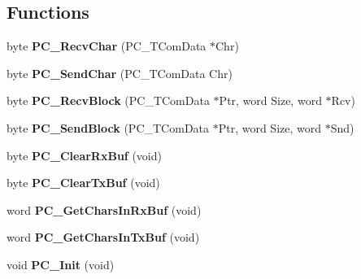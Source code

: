 \subsection*{Functions}
\begin{DoxyCompactItemize}
\item 
\hypertarget{group___p_c__module_ga546cd8422f12db7647f5f0d2693e42b4}{byte {\bfseries P\-C\-\_\-\-Recv\-Char} (P\-C\-\_\-\-T\-Com\-Data $\ast$Chr)}\label{group___p_c__module_ga546cd8422f12db7647f5f0d2693e42b4}

\item 
\hypertarget{group___p_c__module_gaa5b1e2fa0d0289376137ebc1d06421e0}{byte {\bfseries P\-C\-\_\-\-Send\-Char} (P\-C\-\_\-\-T\-Com\-Data Chr)}\label{group___p_c__module_gaa5b1e2fa0d0289376137ebc1d06421e0}

\item 
\hypertarget{group___p_c__module_ga3fa8bf2d676088f0caad92845ab5d996}{byte {\bfseries P\-C\-\_\-\-Recv\-Block} (P\-C\-\_\-\-T\-Com\-Data $\ast$Ptr, word Size, word $\ast$Rcv)}\label{group___p_c__module_ga3fa8bf2d676088f0caad92845ab5d996}

\item 
\hypertarget{group___p_c__module_ga871909e77d1420867d6c82d287978bdb}{byte {\bfseries P\-C\-\_\-\-Send\-Block} (P\-C\-\_\-\-T\-Com\-Data $\ast$Ptr, word Size, word $\ast$Snd)}\label{group___p_c__module_ga871909e77d1420867d6c82d287978bdb}

\item 
\hypertarget{group___p_c__module_ga2005636aeca4af9530e1082a029491a5}{byte {\bfseries P\-C\-\_\-\-Clear\-Rx\-Buf} (void)}\label{group___p_c__module_ga2005636aeca4af9530e1082a029491a5}

\item 
\hypertarget{group___p_c__module_gae2e1608fda07f5e8160b8e6272e8943c}{byte {\bfseries P\-C\-\_\-\-Clear\-Tx\-Buf} (void)}\label{group___p_c__module_gae2e1608fda07f5e8160b8e6272e8943c}

\item 
\hypertarget{group___p_c__module_ga8d3c73eba0f74441131507745d3cbbfb}{word {\bfseries P\-C\-\_\-\-Get\-Chars\-In\-Rx\-Buf} (void)}\label{group___p_c__module_ga8d3c73eba0f74441131507745d3cbbfb}

\item 
\hypertarget{group___p_c__module_ga05ea0d3e62257b21970f55f4be19b70e}{word {\bfseries P\-C\-\_\-\-Get\-Chars\-In\-Tx\-Buf} (void)}\label{group___p_c__module_ga05ea0d3e62257b21970f55f4be19b70e}

\item 
\hypertarget{group___p_c__module_gae38e6bd23fd0bcff007c523fadcc5c6b}{void {\bfseries P\-C\-\_\-\-Init} (void)}\label{group___p_c__module_gae38e6bd23fd0bcff007c523fadcc5c6b}


\end{DoxyCompactItemize}
